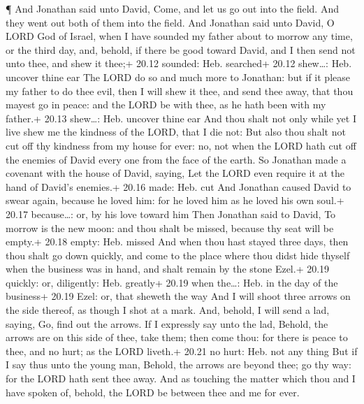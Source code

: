  ¶ And Jonathan said unto David, Come, and let us go out
into the field. And they went out both of them into the field.
 And Jonathan said unto David, O LORD God of Israel, when I
have sounded my father about to morrow any time, or the third day, and,
behold, if there be good toward David, and I then send not unto thee,
and shew it thee;+ 20.12 sounded: Heb. searched+ 20.12 shew\ldots: Heb.
uncover thine ear  The LORD do so and much more to
Jonathan: but if it please my father to do thee evil, then I will shew
it thee, and send thee away, that thou mayest go in peace: and the LORD
be with thee, as he hath been with my father.+ 20.13 shew\ldots: Heb.
uncover thine ear  And thou shalt not only while yet I live
shew me the kindness of the LORD, that I die not:  But also
thou shalt not cut off thy kindness from my house for ever: no, not when
the LORD hath cut off the enemies of David every one from the face of
the earth.  So Jonathan made a covenant with the house of
David, saying, Let the LORD even require it at the hand of David's
enemies.+ 20.16 made: Heb. cut  And Jonathan caused David
to swear again, because he loved him: for he loved him as he loved his
own soul.+ 20.17 because\ldots: or, by his love toward him 
Then Jonathan said to David, To morrow is the new moon: and thou shalt
be missed, because thy seat will be empty.+ 20.18 empty: Heb. missed
 And when thou hast stayed three days, then thou shalt go
down quickly, and come to the place where thou didst hide thyself when
the business was in hand, and shalt remain by the stone Ezel.+ 20.19
quickly: or, diligently: Heb. greatly+ 20.19 when the\ldots: Heb. in the
day of the business+ 20.19 Ezel: or, that sheweth the way 
And I will shoot three arrows on the side thereof, as though I shot at a
mark.  And, behold, I will send a lad, saying, Go, find out
the arrows. If I expressly say unto the lad, Behold, the arrows are on
this side of thee, take them; then come thou: for there is peace to
thee, and no hurt; as the LORD liveth.+ 20.21 no hurt: Heb. not any
thing  But if I say thus unto the young man, Behold, the
arrows are beyond thee; go thy way: for the LORD hath sent thee away.
 And as touching the matter which thou and I have spoken
of, behold, the LORD be between thee and me for ever.


